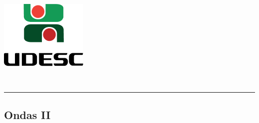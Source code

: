 \thispagestyle{empty}
\begin{center}
	\begin{minipage}[!]{\linewidth}
        \begin{minipage}[!]{.19\linewidth}
            \includegraphics[width=\linewidth]{img/logo.png}           
        \end{minipage}
        \begin{minipage}[!]{.8\linewidth}
            \center
            \ABNTEXchapterfont\normalsize\MakeUppercase{\imprimirinstituicao}
            \par
            \vspace*{10pt}                     
            \ABNTEXchapterfont\normalsize\MakeUppercase{\centro}
            \par
            \vspace*{10pt}           
            \ABNTEXchapterfont\normalsize\MakeUppercase{\disciplina}
        \end{minipage}        
    \end{minipage}
    \\ \vspace{0.5cm}
    \rule{\textwidth}{.5pt}   
\end{center}
    \textual
    \begin{center}
      \section{Ondas II}
      \par
    \end{center}
    
